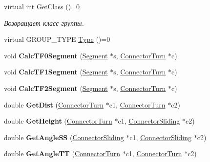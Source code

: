 \begin{DoxyCompactItemize}
virtual int \hyperlink{class_group_a9c80a5acc90124def56c64615e761cb1}{GetClass} ()=0
\begin{DoxyCompactList}\small\item\em Возвращает класс группы. \item\end{DoxyCompactList}\item 
virtual GROUP\_\-TYPE \hyperlink{class_group_a7398c21242d4663f5ef824a200d51f09}{Type} ()=0
\item 
\hypertarget{class_group_a16f996151b64d9c71b2028c18b4f339d}{
void {\bfseries CalcTF0Segment} (\hyperlink{class_segment}{Segment} $\ast$s, \hyperlink{struct_connector_turn}{ConnectorTurn} $\ast$c)}
\label{class_group_a16f996151b64d9c71b2028c18b4f339d}

\item 
\hypertarget{class_group_a6ec9563d59ec110d7aeb9305927a6ff0}{
void {\bfseries CalcTF1Segment} (\hyperlink{class_segment}{Segment} $\ast$s, \hyperlink{struct_connector_turn}{ConnectorTurn} $\ast$c)}
\label{class_group_a6ec9563d59ec110d7aeb9305927a6ff0}

\item 
\hypertarget{class_group_a410ba55bb3a6256dec2f5b93fad25037}{
void {\bfseries CalcTF2Segment} (\hyperlink{class_segment}{Segment} $\ast$s, \hyperlink{struct_connector_turn}{ConnectorTurn} $\ast$c)}
\label{class_group_a410ba55bb3a6256dec2f5b93fad25037}

\item 
\hypertarget{class_group_a4e8e19567a32b89cbbdb1f4570314575}{
double {\bfseries GetDist} (\hyperlink{struct_connector_turn}{ConnectorTurn} $\ast$c1, \hyperlink{struct_connector_turn}{ConnectorTurn} $\ast$c2)}
\label{class_group_a4e8e19567a32b89cbbdb1f4570314575}

\item 
\hypertarget{class_group_aa032a722c420fbb2220668130189002d}{
double {\bfseries GetHeight} (\hyperlink{struct_connector_turn}{ConnectorTurn} $\ast$c1, \hyperlink{struct_connector_sliding}{ConnectorSliding} $\ast$c2)}
\label{class_group_aa032a722c420fbb2220668130189002d}

\item 
\hypertarget{class_group_a876298e67081cdaa74e2c7c200421e3c}{
double {\bfseries GetAngleSS} (\hyperlink{struct_connector_sliding}{ConnectorSliding} $\ast$c1, \hyperlink{struct_connector_sliding}{ConnectorSliding} $\ast$c2)}
\label{class_group_a876298e67081cdaa74e2c7c200421e3c}

\item 
\hypertarget{class_group_aa7aa5d86c9043758bdc206a2d8670232}{
double {\bfseries GetAngleTT} (\hyperlink{struct_connector_turn}{ConnectorTurn} $\ast$c1, \hyperlink{struct_connector_turn}{ConnectorTurn} $\ast$c2)}
\label{class_group_aa7aa5d86c9043758bdc206a2d8670232}

\end{DoxyCompactItemize}
